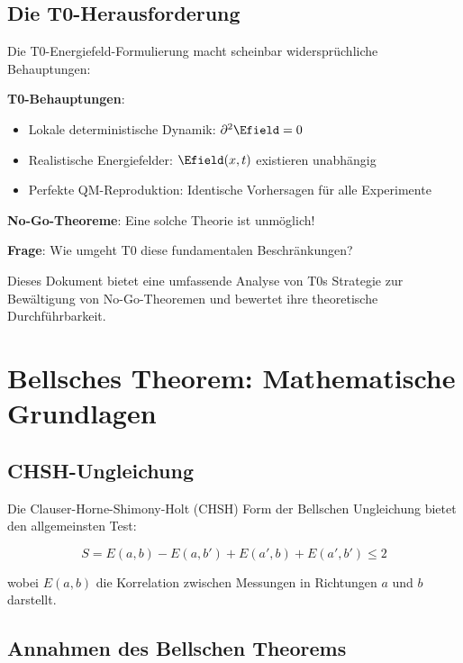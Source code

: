 	\subsection{Die T0-Herausforderung}
	
	Die T0-Energiefeld-Formulierung macht scheinbar widersprüchliche Behauptungen:
	
	\begin{tcolorbox}[colback=red!5!white,colframe=red!75!black,title=T0-Behauptungen vs No-Go-Theoreme]
		\textbf{T0-Behauptungen}:
		\begin{itemize}
			\item Lokale deterministische Dynamik: $\partial^2 \Efield = 0$
			\item Realistische Energiefelder: $\Efield(x,t)$ existieren unabhängig
			\item Perfekte QM-Reproduktion: Identische Vorhersagen für alle Experimente
		\end{itemize}
		
		\textbf{No-Go-Theoreme}: Eine solche Theorie ist unmöglich!
		
		\textbf{Frage}: Wie umgeht T0 diese fundamentalen Beschränkungen?
	\end{tcolorbox}
	
	Dieses Dokument bietet eine umfassende Analyse von T0s Strategie zur Bewältigung von No-Go-Theoremen und bewertet ihre theoretische Durchführbarkeit.
	
	\section{Bellsches Theorem: Mathematische Grundlagen}
	
	\subsection{CHSH-Ungleichung}
	
	Die Clauser-Horne-Shimony-Holt (CHSH) Form der Bellschen Ungleichung bietet den allgemeinsten Test:
	
	\begin{equation}
		S = E(a,b) - E(a,b') + E(a',b) + E(a',b') \leq 2
		\label{eq:chsh_inequality}
	\end{equation}
	
	wobei $E(a,b)$ die Korrelation zwischen Messungen in Richtungen $a$ und $b$ darstellt.
	
	\subsection{Annahmen des Bellschen Theorems}
	
